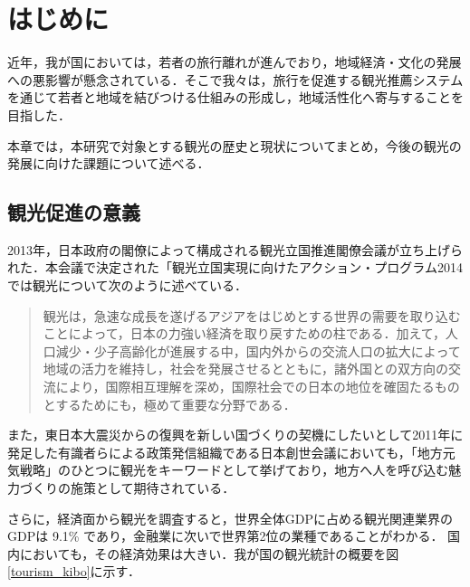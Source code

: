\documentclass{jsarticle}
\begin{document}
\newpage

\setcounter{page}{1}

\tableofcontents
\newpage
\listoftables
\newpage
\listoffigures
\newpage

\section{はじめに}

近年，我が国においては，若者の旅行離れが進んでおり，地域経済・文化の発展への悪影響が懸念されている．そこで我々は，旅行を促進する観光推薦システムを通じて若者と地域を結びつける仕組みの形成し，地域活性化へ寄与することを目指した．

本章では，本研究で対象とする観光の歴史と現状についてまとめ，今後の観光の発展に向けた課題について述べる．

\newpage

\subsection{観光促進の意義}

2013年，日本政府の閣僚によって構成される観光立国推進閣僚会議が立ち上げられた．本会議で決定された「観光立国実現に向けたアクション・プログラム2014\cite{action_program_2014}では観光について次のように述べている．

\begin{quote}
観光は，急速な成長を遂げるアジアをはじめとする世界の需要を取り込むことによって，日本の力強い経済を取り戻すための柱である．加えて，人口減少・少子高齢化が進展する中，国内外からの交流人口の拡大によって地域の活力を維持し，社会を発展させるとともに，諸外国との双方向の交流により，国際相互理解を深め，国際社会での日本の地位を確固たるものとするためにも，極めて重要な分野である．
\end{quote}

また，東日本大震災からの復興を新しい国づくりの契機にしたいとして2011年に発足した有識者らによる政策発信組織である日本創世会議においても，「地方元気戦略」のひとつに観光をキーワードとして挙げており，地方へ人を呼び込む魅力づくりの施策として期待されている\cite{nippon_sousei}．

さらに，経済面から観光を調査すると，世界全体GDPに占める観光関連業界のGDPは 9.1\% であり，金融業に次いで世界第2位の業種であることがわかる．
国内においても，その経済効果は大きい．我が国の観光統計の概要を図\ref{tourism_kibo}に示す．
\end{document}

